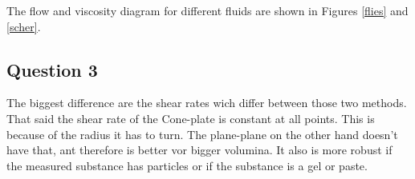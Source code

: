\documentclass[10pt,a4paper,ngerman]{scrartcl}
\begin{document}
			The flow and viscosity diagram for different fluids are shown in Figures \ref{flies} and \ref{scher}.

		\subsection{Question 3}

			The biggest difference are the shear rates wich differ between those two methods.
			That said the shear rate of the Cone-plate is constant at all points. This is because of the radius it has to turn.
			The plane-plane on the other hand doesn't have that, ant therefore is better vor bigger volumina.
			It also is more robust if the measured substance has particles or if the substance is a gel or paste. 
 

\printbibliography
\end{document}
